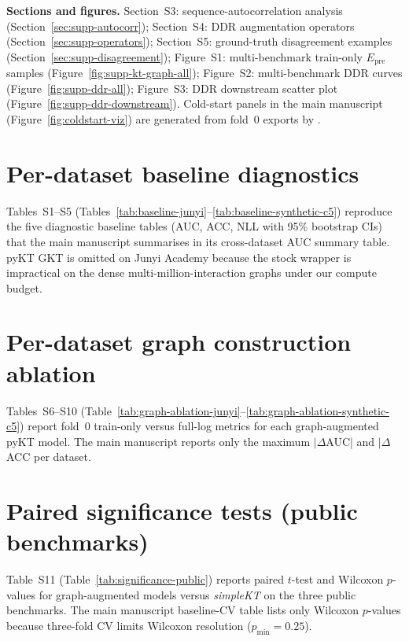 \documentclass[pdflatex,sn-basic]{sn-jnl}
\newcommand{\Epre}{\ensuremath{E_{\text{pre}}}}
\newcommand{\DDR}{\textsc{DDR}}
\begin{document}
\medskip\noindent\textbf{Sections and figures.}
Section~S3: sequence-autocorrelation analysis
(Section~\ref{sec:supp-autocorr});
Section~S4: \DDR{} augmentation operators (Section~\ref{sec:supp-operators});
Section~S5: ground-truth disagreement examples
(Section~\ref{sec:supp-disagreement});
Figure~S1: multi-benchmark train-only $\Epre$ samples
(Figure~\ref{fig:supp-kt-graph-all});
Figure~S2: multi-benchmark \DDR{} curves (Figure~\ref{fig:supp-ddr-all});
Figure~S3: \DDR{} downstream scatter plot
(Figure~\ref{fig:supp-ddr-downstream}).
Cold-start panels in the main manuscript (Figure~\ref{fig:coldstart-viz}) are
generated from fold~0 exports by .

\section{Per-dataset baseline diagnostics}
\label{sec:supp-baseline}
Tables~S1--S5 (Tables~\ref{tab:baseline-junyi}--\ref{tab:baseline-synthetic-c5})
reproduce the five diagnostic baseline tables (AUC, ACC, NLL with 95\% bootstrap
CIs) that the main manuscript summarises in its cross-dataset AUC summary table.
pyKT GKT is omitted on Junyi Academy because the stock wrapper is impractical on
the dense multi-million-interaction graphs under our compute budget.



\section{Per-dataset graph construction ablation}
\label{sec:supp-ablation}
Tables~S6--S10 (Table~\ref{tab:graph-ablation-junyi}--\ref{tab:graph-ablation-synthetic-c5})
report fold~0 train-only versus full-log metrics for each graph-augmented pyKT
model. The main manuscript reports only the maximum $|\Delta$AUC| and
$|\Delta$ACC per dataset.



\section{Paired significance tests (public benchmarks)}
\label{sec:supp-significance}
Table~S11 (Table~\ref{tab:significance-public}) reports paired $t$-test and
Wilcoxon $p$-values for graph-augmented models versus \textit{simpleKT} on the
three public benchmarks. The main manuscript baseline-CV table lists only
Wilcoxon $p$-values because three-fold CV limits Wilcoxon resolution
($p_{\min}{=}0.25$).
\end{document}

